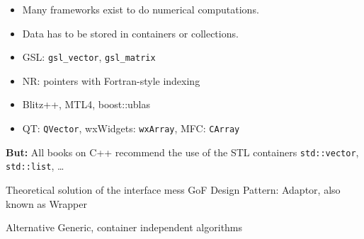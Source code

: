 \begin{frame}
  
    \begin{itemize}
      \item Many frameworks exist to do numerical computations.
      \item Data has to be stored in containers or collections.
      \item GSL: {\tt gsl\_vector}, {\tt gsl\_matrix}
      \item NR: pointers with Fortran-style indexing
      \item Blitz++, MTL4, boost::ublas
      \item QT: {\tt QVector}, wxWidgets: {\tt wxArray}, MFC: {\tt CArray}
    \end{itemize}


    {\bf \color{red} But:} All books on C++ recommend the use of the STL containers {\tt std::vector},
    {\tt std::list}, \dots

 \pause


  \begin{block}{Theoretical solution of the interface mess}
  GoF Design Pattern: Adaptor, also known as Wrapper

  \end{block}

  \pause

  \begin{exampleblock}{Alternative}
   Generic, container independent algorithms
  \end{exampleblock}

\end{frame}


